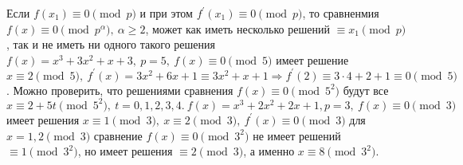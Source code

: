     \begin{comm}
        Если $f(x_1)\equiv 0\pmod{p}$ и при этом $f^{\prime}(x_1)\equiv 0\pmod{p}$, то сравненмия $f(x)\equiv 0\pmod{p^{\alpha}},\ \alpha\geq 2$, может как иметь несколько решений $\equiv x_1\pmod{p}$, так и не иметь ни одного такого решения $f(x)=x^3+3x^2+x+3,\ p=5,\ f(x)\equiv 0\pmod{5}$ имеет решение $x\equiv 2\pmod{5},\ f^{\prime}(x)=3x^2+6x+1\equiv 3x^2+x+1 \Rightarrow f^{\prime}(2)\equiv 3\cdot 4+2+1\equiv 0\pmod{5}$. Можно проверить, что решениями сравнения $f(x)\equiv 0\pmod{5^2}$ будут все $x\equiv 2+5t\pmod{5^2},\ t=0,1,2,3,4.\ f(x)=x^3+2x^2+2x+1, p=3,\ f(x)\equiv 0\pmod{3}$ имеет решения $x\equiv 1\pmod{3},\ x\equiv 2\pmod{3},\ f^{\prime}(x)\equiv 0\pmod{3}$ для $x=1,2\pmod{3}$ сравнение $f(x)\equiv 0\pmod{3^2}$ не имеет решений $\equiv 1\pmod{3^2}$, но имеет решения $\equiv 2\pmod{3}$, а именно $x\equiv 8\pmod{3^2}$. 
    \end{comm}